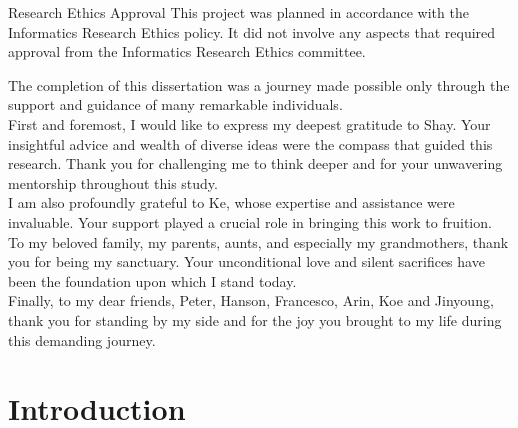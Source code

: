 \documentclass[logo,bsc,singlespacing,parskip]{infthesis}
\begin{document}
\begin{preliminary}
\maketitle

\newenvironment{ethics}
   {\begin{frontenv}{Research Ethics Approval}{\LARGE}}
   {\end{frontenv}\newpage}

\begin{ethics}
This project was planned in accordance with the Informatics Research
Ethics policy. It did not involve any aspects that required approval
from the Informatics Research Ethics committee.

\standarddeclaration
\end{ethics}


\begin{acknowledgements}
The completion of this dissertation was a journey made possible only through the support and guidance of many remarkable individuals.\\

First and foremost, I would like to express my deepest gratitude to Shay. Your insightful advice and wealth of diverse ideas were the compass that guided this research. Thank you for challenging me to think deeper and for your unwavering mentorship throughout this study.\\

I am also profoundly grateful to Ke, whose expertise and assistance were invaluable. Your support played a crucial role in bringing this work to fruition.\\

To my beloved family, my parents, aunts, and especially my grandmothers, thank you for being my sanctuary. Your unconditional love and silent sacrifices have been the foundation upon which I stand today. \\ 

Finally, to my dear friends, Peter, Hanson, Francesco, Arin, Koe and Jinyoung, thank you for standing by my side and for the joy you brought to my life during this demanding journey.
\end{acknowledgements}


\tableofcontents
\end{preliminary}


\chapter{Introduction}
\label{ch:introduction}
\end{document}
